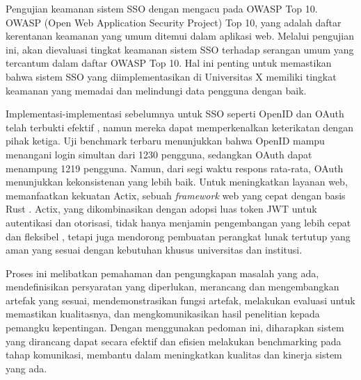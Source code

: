 \documentclass{article}
\begin{document}
Pengujian keamanan sistem SSO dengan mengacu pada OWASP Top 10. OWASP (Open Web Application Security Project) Top 10, yang adalah daftar kerentanan keamanan yang umum ditemui dalam aplikasi web. Melalui pengujian ini, akan dievaluasi tingkat keamanan sistem SSO terhadap serangan umum yang tercantum dalam daftar OWASP Top 10\cite{Priyawati2022WebsiteVT}. Hal ini penting untuk memastikan bahwa sistem SSO yang diimplementasikan di Universitas X memiliki tingkat keamanan yang memadai dan melindungi data pengguna dengan baik.

Implementasi-implementasi sebelumnya untuk SSO seperti OpenID dan OAuth telah terbukti efektif \cite{ComparativeAnaWaluyo2022}, namun mereka dapat memperkenalkan keterikatan dengan pihak ketiga. Uji benchmark terbaru menunjukkan bahwa OpenID mampu menangani login simultan dari 1230 pengguna, sedangkan OAuth dapat menampung 1219 pengguna\cite{ComparativeAnaWaluyo2022}. Namun, dari segi waktu respons rata-rata, OAuth menunjukkan kekonsistenan yang lebih baik. Untuk meningkatkan layanan web, memanfaatkan kekuatan Actix, sebuah \emph{framework} web yang cepat dengan basis Rust\cite{kyriakou2022complementing} . Actix, yang dikombinasikan dengan adopsi luas token JWT untuk autentikasi dan otorisasi, tidak hanya menjamin pengembangan yang lebih cepat dan fleksibel \cite{ADynamicFederAlsade2022}, tetapi juga mendorong pembuatan perangkat lunak tertutup yang aman yang sesuai dengan kebutuhan khusus universitas dan institusi.

Proses ini melibatkan pemahaman dan pengungkapan masalah yang ada, mendefinisikan persyaratan yang diperlukan, merancang dan mengembangkan artefak yang sesuai, mendemonstrasikan fungsi artefak, melakukan evaluasi untuk memastikan kualitasnya, dan mengkomunikasikan hasil penelitian kepada pemangku kepentingan. Dengan menggunakan pedoman ini, diharapkan sistem yang dirancang dapat secara efektif dan efisien melakukan benchmarking pada tahap komunikasi, membantu dalam meningkatkan kualitas dan kinerja sistem yang ada\cite{DesignScienceHevner2004}.



\newpage
\end{document}
